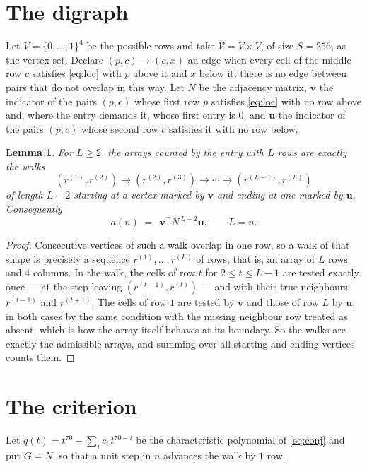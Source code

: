 \documentclass[11pt,a4paper]{article}
\theoremstyle{plain}
\newtheorem{lemma}[theorem]{Lemma}
\theoremstyle{definition}
\begin{document}
\section{The digraph}

Let $V=\{0,\dots,1\}^{4}$ be the possible rows and take
$\mathcal V=V\times V$, of size $S=256$, as the vertex set. Declare $(p,c)\to(c,x)$ an edge
when every cell of the middle row $c$ satisfies \eqref{eq:loc} with $p$ above it and $x$
below it; there is no edge between pairs that do not overlap in this way. Let $N$ be the
adjacency matrix, $\mathbf{v}$ the indicator of the pairs $(p,c)$ whose first row $p$
satisfies \eqref{eq:loc} with no row above and, where the entry demands it, whose first entry is $0$, and $\mathbf{u}$ the indicator of
the pairs $(p,c)$ whose second row $c$ satisfies it with no row below.

\begin{lemma}\label{lem:walk}
For $L\ge2$, the arrays counted by the entry with $L$ rows are exactly the walks
\[
(r^{(1)},r^{(2)})\to(r^{(2)},r^{(3)})\to\cdots\to(r^{(L-1)},r^{(L)})
\]
of length $L-2$ starting at a vertex marked by $\mathbf{v}$ and ending at one marked by
$\mathbf{u}$. Consequently
\[
a(n)\;=\;\,\mathbf{v}^{\!\top}N^{\,L-2}\mathbf{u},\qquad L=n .
\]
\end{lemma}

\begin{proof}
Consecutive vertices of such a walk overlap in one row, so a walk of that shape is
precisely a sequence $r^{(1)},\dots,r^{(L)}$ of rows, that is, an array of $L$ rows
and $4$ columns. In the walk, the cells of row $t$ for $2\le t\le L-1$ are tested
exactly once --- at the step leaving $(r^{(t-1)},r^{(t)})$ --- and with their true
neighbours $r^{(t-1)}$ and $r^{(t+1)}$. The cells of row $1$ are tested by
$\mathbf{v}$ and those of row $L$ by $\mathbf{u}$, in both cases by the same condition
with the missing neighbour row treated as absent, which is how the array itself behaves at
its boundary. So the walks are exactly the admissible arrays, and summing over all starting
and ending vertices counts them.
\end{proof}

\section{The criterion}

Let $q(t)=t^{70}-\sum_i c_i\,t^{70-i}$ be the characteristic polynomial of
\eqref{eq:conj} and put $G=N$, so that a unit step in $n$ advances the walk by
$1$ row.
\end{document}
